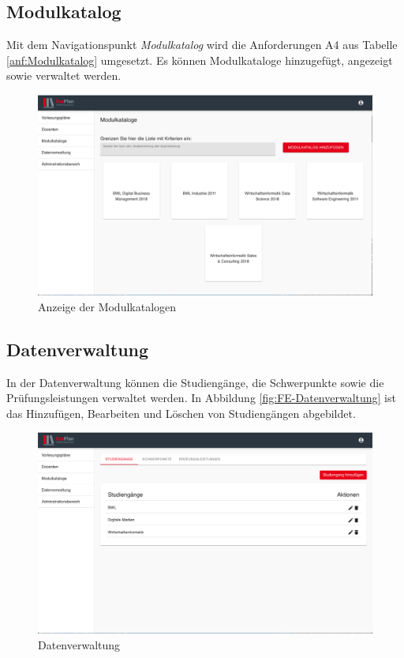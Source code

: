 \subsection{Modulkatalog}
Mit dem Navigationspunkt \textit{Modulkatalog} wird die Anforderungen A4 aus Tabelle \vref{anf:Modulkatalog} umgesetzt. 
Es können Modulkataloge hinzugefügt, angezeigt sowie verwaltet werden. 
\begin{figure}[H]
	\centering 
	\includegraphics[width=\textwidth]{img/FrontEnd/Modulkataloge.png}
	\caption[Anzeige der Modulkatalogen]{\label{fig:FE-Modulkataloge}Anzeige der Modulkatalogen}
\end{figure}

\subsection{Datenverwaltung}
In der Datenverwaltung können die Studiengänge, die Schwerpunkte sowie die Prüfungsleistungen verwaltet werden.
In Abbildung \vref{fig:FE-Datenverwaltung} ist das Hinzufügen, Bearbeiten und Löschen von Studiengängen abgebildet.
\begin{figure}[H]
	\centering 
	\includegraphics[width=\textwidth]{img/FrontEnd/Datenverwaltung.png}
	\caption[Datenverwaltung]{\label{fig:FE-Datenverwaltung}Datenverwaltung}
\end{figure}

